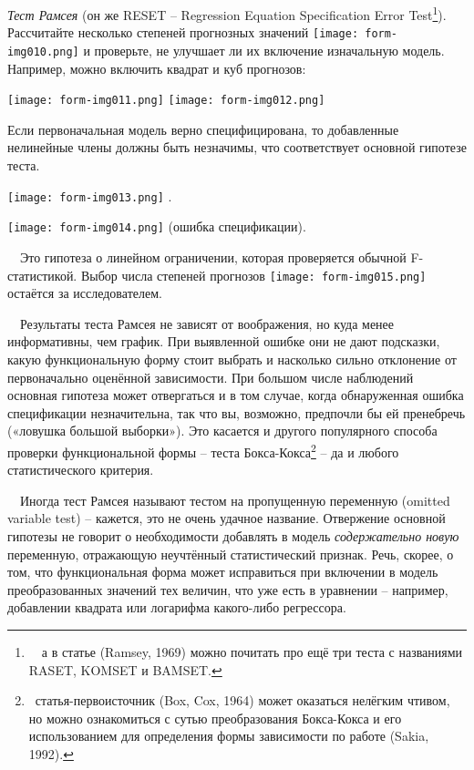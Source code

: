 \documentclass[a4paper]{article}
\begin{document}
\textit{Тест Рамсея} (он же RESET – Regression Equation Specification Error Test\footnote{\ \ а в статье (Ramsey, 1969) можно почитать про ещё три теста с названиями RASET, KOMSET и BAMSET.}). Рассчитайте несколько степеней прогнозных значений  \texttt{[image: form-img010.png]}  и проверьте, не улучшает ли их включение изначальную модель. Например, можно включить квадрат и куб прогнозов:

 \texttt{[image: form-img011.png]}  \texttt{[image: form-img012.png]} 

Если первоначальная модель верно специфицирована, то добавленные нелинейные члены должны быть незначимы, что соответствует основной гипотезе теста.

 \texttt{[image: form-img013.png]} .

 \texttt{[image: form-img014.png]}  (ошибка спецификации).

\ \ Это гипотеза о линейном ограничении, которая проверяется обычной F{}-статистикой. Выбор числа степеней прогнозов  \texttt{[image: form-img015.png]}  остаётся за исследователем.

\ \ Результаты теста Рамсея не зависят от воображения, но куда менее информативны, чем график. При выявленной ошибке они не дают подсказки, какую функциональную форму стоит выбрать и насколько сильно отклонение от первоначально оценённой зависимости. При большом числе наблюдений основная гипотеза может отвергаться и в том случае, когда обнаруженная ошибка спецификации незначительна, так что вы, возможно, предпочли бы ей пренебречь («ловушка большой выборки»). Это касается и другого популярного способа проверки функциональной формы – теста Бокса-Кокса\footnote{\ статья-первоисточник (Box, Cox, 1964) может оказаться нелёгким чтивом, но можно ознакомиться с сутью преобразования Бокса-Кокса и его использованием для определения формы зависимости по работе (Sakia, 1992).} – да и любого статистического критерия.

\ \ Иногда тест Рамсея называют тестом на пропущенную переменную (omitted variable test) – кажется, это не очень удачное название. Отвержение основной гипотезы не говорит о необходимости добавлять в модель \textit{содержательно новую} переменную, отражающую неучтённый статистический признак. Речь, скорее, о том, что функциональная форма может исправиться при включении в модель преобразованных значений тех величин, что уже есть в уравнении – например, добавлении квадрата или логарифма какого-либо регрессора.
\end{document}

